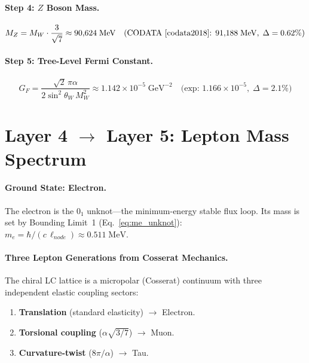 \paragraph{Step 4: $Z$ Boson Mass.}
\begin{equation}
    M_Z = M_W \cdot \frac{3}{\sqrt{7}}
    \approx 90{,}624\;\text{MeV}
    \quad\text{(CODATA~\cite{codata2018}: } 91{,}188\;\text{MeV},\; \Delta = 0.62\%\text{)}
    \label{eq:MZ}
\end{equation}

\paragraph{Step 5: Tree-Level Fermi Constant.}
\begin{equation}
    G_F = \frac{\sqrt{2}\,\pi\alpha}{2\sin^2\!\theta_W\,M_W^2}
    \approx 1.142 \times 10^{-5}\;\text{GeV}^{-2}
    \quad\text{(exp: } 1.166 \times 10^{-5},\; \Delta = 2.1\%\text{)}
    \label{eq:GF}
\end{equation}

\section{Layer 4 $\to$ Layer 5: Lepton Mass Spectrum}
\label{sec:layer45}

\paragraph{Ground State: Electron.}
The electron is the $0_1$ unknot---the minimum-energy stable flux loop.
Its mass is set by Bounding Limit~1 (Eq.~\ref{eq:me_unknot}):
$m_e = \hbar / (c\,\ell_{node}) \approx 0.511\;\text{MeV}$.

\paragraph{Three Lepton Generations from Cosserat Mechanics.}
The chiral LC lattice is a micropolar (Cosserat) continuum with three
independent elastic coupling sectors:
\begin{enumerate}
    \item \textbf{Translation} (standard elasticity) $\to$ Electron.
    \item \textbf{Torsional coupling} ($\alpha\sqrt{3/7}$) $\to$ Muon.
    \item \textbf{Curvature-twist} ($8\pi/\alpha$) $\to$ Tau.
\end{enumerate}


